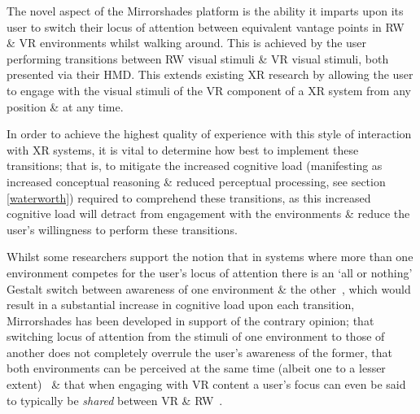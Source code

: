 \documentclass[oneside]{book}
\begin{document}
\newcommand{\breakinpresencefootnote}{\footnote{The definition of \textbf{break in presence} adopted herein is the second from Waterworth \& Waterworth~\cite{Waterworth2001} (p205): a movement along the focus axis away from presence in the real or a virtual environment \& toward absence. This differs to Slater \& Steed's original definition in~\cite{Slater2000} as they considered presence only in terms of attending to stimuli from a virtual environment, with a break in presence as a Gestalt switch to instead attending to stimuli from the real environment. Waterworth \& Waterworth's model considers presence in terms of attending to stimuli from either the real \textit{or a virtual} environment, with a break in presence representing absence in the sense of heightened conceptual load \& the resultant reduced perceptual processing of environmental stimuli originating from \textit{either} the real or a virtual environment. This definition better fits the situation invoked by the Mirrorshades platform, which is concerned with intentionally \& willingly switching engagement between stimuli from both real \& virtual environments, rather than engaging with stimuli from only a virtual environment in a scenario where stimuli from the real environment are considered a `distraction'.}}

The novel aspect of the Mirrorshades platform is the ability it imparts upon its user to switch their locus of attention between equivalent vantage points in RW \& VR environments whilst walking around. This is achieved by the user performing transitions between RW visual stimuli \& VR visual stimuli, both presented via their HMD. This extends existing XR research by allowing the user to engage with the visual stimuli of the VR component of a XR system from any position \& at any time.

In order to achieve the highest quality of experience with this style of interaction with XR systems, it is vital to determine how best to implement these transitions; that is, to mitigate the increased cognitive load (manifesting as increased conceptual reasoning \& reduced perceptual processing, see section \ref{waterworth}) required to comprehend these transitions, as this increased cognitive load will detract from engagement with the environments \& reduce the user's willingness to perform these transitions.

Whilst some researchers support the notion that in systems where more than one environment competes for the user's locus of attention there is an `all or nothing' Gestalt switch between awareness of one environment \& the other~\cite{Slater2002}, which would result in a substantial increase in cognitive load upon each transition, Mirrorshades has been developed in support of the contrary opinion; that switching locus of attention from the stimuli of one environment to those of another does not completely overrule the user's awareness of the former, that both environments can be perceived at the same time (albeit one to a lesser extent)~\cite{Ijsselsteijn2001} \& that when engaging with VR content a user's focus can even be said to typically be \textit{shared} between VR \& RW~\cite{Waterworth2001}.
\end{document}
